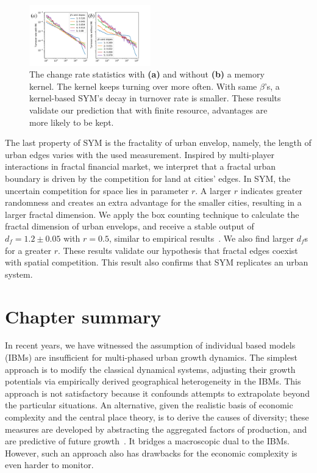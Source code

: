\begin{figure}
	\centering
	\includegraphics[width = 0.47\textwidth]{Pics/switchrate.pdf}
	\caption{The change rate statistics with \textbf{(a)} and without \textbf{(b)} a memory kernel. The kernel keeps turning over more often. With same $\beta$'s, a kernel-based SYM's decay in turnover rate is smaller. These results validate our prediction that with finite resource, advantages are more likely to be kept.}
	\label{changerate}
\end{figure}

The last property of SYM is the fractality of urban envelop, namely, the length of urban edges varies with the used measurement. Inspired by multi-player interactions in fractal financial market\cite{PhysRevE.65.037106}, we interpret that a fractal urban boundary is driven by the competition for land at cities' edges. In SYM, the uncertain competition for space lies in parameter $r$. A larger $r$ indicates greater randomness and creates an extra advantage for the smaller cities, resulting in a larger fractal dimension. We apply the box counting technique to calculate the fractal dimension of urban envelops, and receive a stable output of $d_f = 1.2\pm 0.05$ with $r = 0.5$, similar to empirical results~\cite{batty1992form}. We also find larger $d_f$s for a greater $r$. These results validate our hypothesis that fractal edges coexist with spatial competition. This result also confirms that SYM replicates an urban system.

\section{Chapter summary}

In recent years, we have witnessed the assumption of individual based models (IBMs) are insufficient for multi-phased urban growth dynamics. The simplest approach is to modify the classical dynamical systems, adjusting their growth potentials via empirically derived geographical heterogeneity in the IBMs. This approach is not satisfactory because it confounds attempts to extrapolate beyond the particular situations. An alternative, given the realistic basis of economic complexity and the central place theory, is to derive the causes of diversity; these measures are developed by abstracting the aggregated factors of production, and are predictive of future growth~\cite{Hidalgo10570}. It bridges a macroscopic dual to the IBMs. However, such an approach also has drawbacks for the economic complexity is even harder to monitor. 

